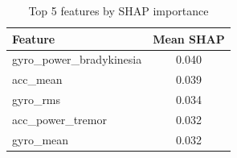 \begin{table}[H]
\centering
\caption{Top 5 features by SHAP importance}
\label{tab:shap}
\begin{tabular}{lc}
\toprule
\textbf{Feature} & \textbf{Mean SHAP} \\
\midrule
gyro\_power\_bradykinesia & 0.040 \\
acc\_mean & 0.039 \\
gyro\_rms & 0.034 \\
acc\_power\_tremor & 0.032 \\
gyro\_mean & 0.032 \\
\bottomrule
\end{tabular}
\end{table}
